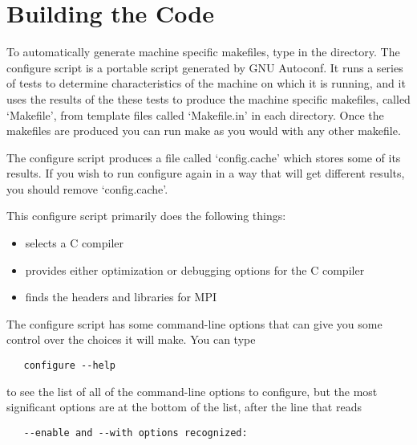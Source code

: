 \chapter{Building the Code}
\label{Building the Code}

To automatically generate machine specific makefiles, type
 in the  directory.  The configure
script is a portable script generated by GNU Autoconf.  It runs a
series of tests to determine characteristics of the machine on which
it is running, and it uses the results of the these tests to produce
the machine specific makefiles, called `Makefile', from template files
called `Makefile.in' in each directory.  Once the makefiles are
produced you can run make as you would with any other makefile.

The configure script produces a file called `config.cache' which
stores some of its results.  If you wish to run configure again in a
way that will get different results, you should remove `config.cache'.

This configure script primarily does the following things:
\begin{itemize}
\item selects a C compiler
\item provides either optimization or debugging options for the C compiler
\item finds the headers and libraries for MPI
\end{itemize}

The configure script has some command-line options that can give you
some control over the choices it will make.  You can type
\begin{verbatim}
   configure --help
\end{verbatim}
to see the list of all of the command-line options to configure, but
the most significant options are at the bottom of the list, after the
line that reads
\begin{verbatim}
   --enable and --with options recognized:
\end{verbatim}

